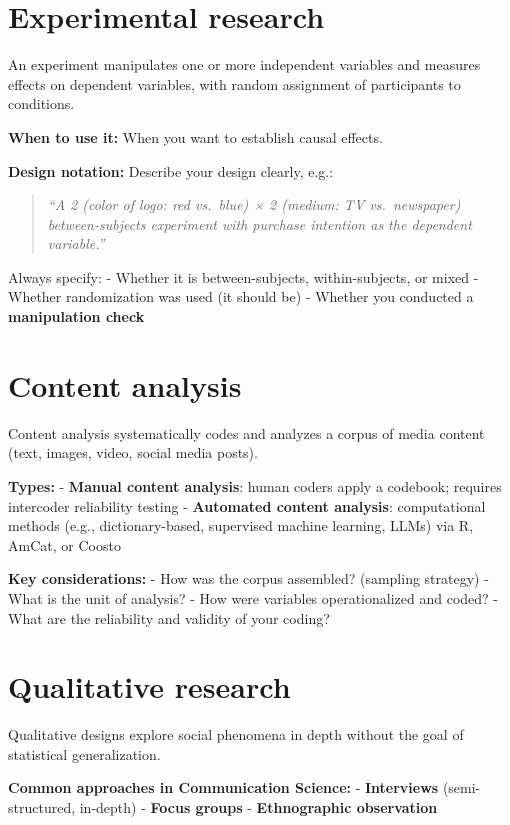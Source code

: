 \documentclass[
  11pt,
  a4paper,
]{scrbook}
\begin{document}
\section{Experimental research}\label{experimental-research}

An experiment manipulates one or more independent variables and measures
effects on dependent variables, with random assignment of participants
to conditions.

\textbf{When to use it:} When you want to establish causal effects.

\textbf{Design notation:} Describe your design clearly, e.g.:

\begin{quote}
\emph{``A 2 (color of logo: red vs.~blue) × 2 (medium: TV vs.~newspaper)
between-subjects experiment with purchase intention as the dependent
variable.''}
\end{quote}

Always specify: - Whether it is between-subjects, within-subjects, or
mixed - Whether randomization was used (it should be) - Whether you
conducted a \textbf{manipulation check}

\section{Content analysis}\label{content-analysis}

Content analysis systematically codes and analyzes a corpus of media
content (text, images, video, social media posts).

\textbf{Types:} - \textbf{Manual content analysis}: human coders apply a
codebook; requires intercoder reliability testing - \textbf{Automated
content analysis}: computational methods (e.g., dictionary-based,
supervised machine learning, LLMs) via R, AmCat, or Coosto

\textbf{Key considerations:} - How was the corpus assembled? (sampling
strategy) - What is the unit of analysis? - How were variables
operationalized and coded? - What are the reliability and validity of
your coding?

\section{Qualitative research}\label{qualitative-research}

Qualitative designs explore social phenomena in depth without the goal
of statistical generalization.

\textbf{Common approaches in Communication Science:} -
\textbf{Interviews} (semi-structured, in-depth) - \textbf{Focus groups}
- \textbf{Ethnographic observation}
\end{document}
